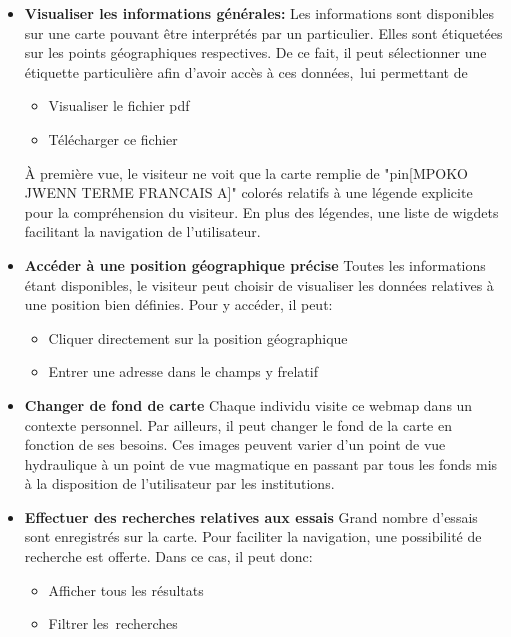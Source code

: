 \begin{itemize}
    \item \textbf{Visualiser les informations générales:}
    Les informations sont disponibles sur une carte pouvant être interprétés
    par un particulier. Elles sont étiquetées sur les points géographiques respectives.
    De ce fait, il peut sélectionner une étiquette particulière afin d'avoir 
    accès à ces données, lui permettant de 
    \begin{itemize}
        \item Visualiser le fichier pdf
        \item Télécharger ce fichier
    \end{itemize}
    \par 
    À première vue, le visiteur ne voit que la carte remplie de 
    "pin[MPOKO JWENN TERME FRANCAIS A]" colorés relatifs à une légende 
    explicite pour la compréhension du visiteur. En plus des légendes, une liste 
    de wigdets facilitant la navigation de l'utilisateur.
    \item \textbf{Accéder à une position géographique précise}
    Toutes les informations étant disponibles, le visiteur peut choisir 
    de visualiser les données relatives à une position bien définies. Pour y accéder, il 
    peut:
    \begin{itemize}
        \item Cliquer directement sur la position géographique
        \item Entrer une adresse dans le champs y frelatif
    \end{itemize}
    \item \textbf{Changer de fond de carte}
    Chaque individu visite ce webmap dans un contexte personnel. Par 
    ailleurs, il peut changer le fond de la carte en fonction de 
    ses besoins. Ces images peuvent varier d'un point de vue hydraulique
    à un point de vue magmatique en passant par tous les fonds mis 
    à la disposition de l'utilisateur par les institutions.
    \item \textbf{Effectuer des recherches relatives aux essais}
    Grand nombre d'essais sont enregistrés sur la carte. Pour faciliter 
    la navigation, une possibilité de recherche est offerte. Dans ce cas,
    il peut donc:
    \begin{itemize}
        \item Afficher tous les résultats
        \item Filtrer les recherches 
    \end{itemize}
\end{itemize}


